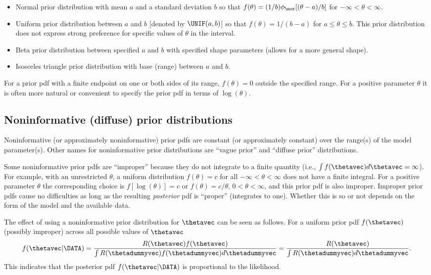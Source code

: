 \begin{itemize}
\item
Normal prior distribution with mean $a$ and a standard deviation $b$
so that $f(\theta)=(1/b)\phi_{\nor}[(\theta-a)/b]$ 
for $-\infty < \theta < \infty$.
\item
Uniform prior distribution between $a$ and $b$ [denoted by $\UNIF(a,b)$] so
that $f(\theta)=1/(b-a)$ for $a \le \theta \le b$.  This prior 
distribution does
not express strong preference for specific values of $\theta$ in the
interval.
\item
Beta prior distribution between specified $a$ and $b$ with specified shape
parameters (allows for a more general shape).
\item
Isosceles triangle prior distribution with base (range) between $a$ and $b$.
\end{itemize}
For a prior pdf with a finite endpoint on one or both sides of its
range, $f(\theta)=0$ outside the specified range.  For a positive
parameter $\theta$ it is often more natural or convenient to specify
the prior pdf in terms of $\log(\theta)$.

\subsection{Noninformative (diffuse) prior distributions}
\label{section:noninformative.prior}

Noninformative (or approximately noninformative) prior pdfs
are constant (or approximately constant) over the range(s) of the
model parameter(s).  Other names for noninformative prior
distributions are ``vague prior'' and ``diffuse prior''
distributions.

Some noninformative prior pdfs are ``improper'' because
they do not integrate to a finite quantity (i.e., $\int f(\thetavec)
d\thetavec= \infty$). For example, with an unrestricted $\theta$,
a uniform distribution
$f(\theta)=c$ for all $ -\infty < \theta < \infty $ does not have a
finite integral.  For a positive parameter $\theta$ the
corresponding choice is $f[\log(\theta)] = c$ or $f(\theta) =
c/\theta$, $0 < \theta < \infty$, and this prior pdf is also
improper.  Improper prior pdfs cause no difficulties as long as
the resulting {\em posterior} pdf is ``proper'' (integrates
to one). Whether this is so or not depends on the form of the model
and the available data.

The effect of using a noninformative prior distribution for
$\thetavec$ can be seen as follows.  For a uniform prior pdf
$f(\thetavec)$ (possibly improper) across all possible values of
$\thetavec$
\begin{displaymath}
f(\thetavec | \DATA)
=
\frac{R(\thetavec) f(\thetavec) }
     { \int R(\thetadummyvec) f(\thetadummyvec) d \thetadummyvec} = \frac{R(\thetavec) }
     { \int R(\thetadummyvec)  d \thetadummyvec}.
\end{displaymath}
This indicates that the posterior pdf
$f(\thetavec | \DATA)$ is
proportional to the likelihood.

